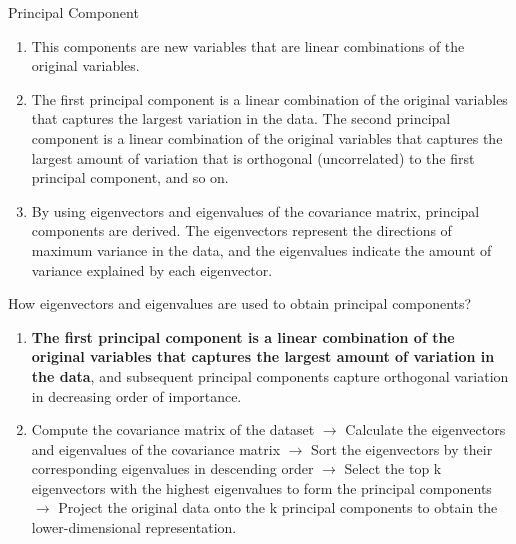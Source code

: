 \documentclass{beamer}
\begin{document}
\begin{frame}{Principal Component}
    \begin{enumerate}
        \item This components are new variables that are linear combinations of the original variables.
        \item The first principal component is a linear combination of the original variables that captures the largest variation in the data. The second principal component is a linear combination of the original variables that captures the largest amount of variation that is orthogonal (uncorrelated) to the first principal component, and so on.
        \item By using eigenvectors and eigenvalues of the covariance matrix, principal components are derived. The eigenvectors represent the directions of maximum variance in the data, and the eigenvalues indicate the amount of variance explained by each eigenvector. \
    \end{enumerate}
\end{frame}

\begin{frame}{How eigenvectors and eigenvalues are used to obtain principal components?}
    \begin{enumerate}
        \item \textbf{The first principal component is a linear combination of the original variables that captures the largest amount of variation in the data}, and subsequent principal components capture orthogonal variation in decreasing order of importance.
        \item Compute the covariance matrix of the dataset $\rightarrow$ Calculate the eigenvectors and eigenvalues of the covariance matrix $\rightarrow$ Sort the eigenvectors by their corresponding eigenvalues in descending order $\rightarrow$ Select the top k eigenvectors with the highest eigenvalues to form the principal components $\rightarrow$ Project the original data onto the k principal components to obtain the lower-dimensional representation.
    \end{enumerate}
\end{frame}
\end{document}
